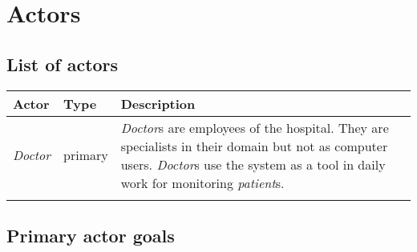 \documentclass[fontsize=12pt,
               paper=a4,
               twoside=false,
               parskip=half,
               ]{scrartcl}
\begin{document}
\newcommand{\doctitle}{Use Case Model}


\tableofcontents


\section{Actors}

\subsection{List of actors}

\begin{tabular}{llp{9cm}}
\toprule
\textbf{Actor} & \textbf{Type} & \textbf{Description} \\ 
\midrule
\emph{Doctor} & primary & \emph{Doctor}s are employees of the hospital. They are specialists
in their domain but not as computer users. \emph{Doctor}s use the system as a tool
in daily work for monitoring \emph{patient}s. \\ 

\\ 
\bottomrule 
\end{tabular} 

\subsection{Primary actor goals}
\end{document}
